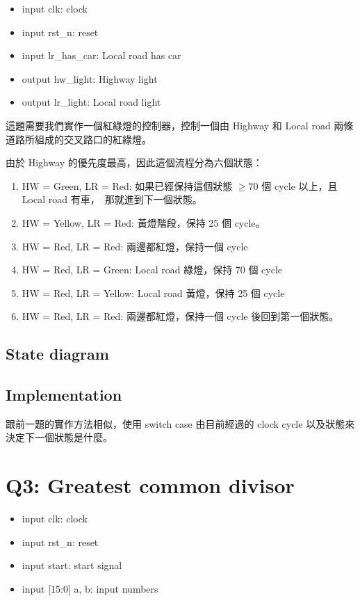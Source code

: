 \documentclass[10.5pt,compsoc,UTF8]{CjC}
\theoremstyle{mystyle}
\begin{document}
\begin{itemize}
  \item input clk: clock
  \item input rst\_n: reset
  \item input lr\_has\_car: Local road has car
  \item output hw\_light: Highway light
  \item output lr\_light: Local road light
\end{itemize}

這題需要我們實作一個紅綠燈的控制器，控制一個由 Highway 和 Local road 兩條道路所組成的交叉路口的紅綠燈。
\par
由於 Highway 的優先度最高，因此這個流程分為六個狀態：
\begin{enumerate}
  \item HW = Green, LR = Red: 如果已經保持這個狀態 $\ge 70$ 個 cycle 以上，且 Local road 有車，\
        那就進到下一個狀態。
  \item HW = Yellow, LR = Red: 黃燈階段，保持 25 個 cycle。
  \item HW = Red, LR = Red: 兩邊都紅燈，保持一個 cycle
  \item HW = Red, LR = Green: Local road 綠燈，保持 70 個 cycle
  \item HW = Red, LR = Yellow: Local road 黃燈，保持 25 個 cycle
  \item HW = Red, LR = Red: 兩邊都紅燈，保持一個 cycle 後回到第一個狀態。
\end{enumerate}

\subsection{State diagram}

\subsection{Implementation}
跟前一題的實作方法相似，使用 switch case 由目前經過的 clock cycle 以及狀態來決定下一個狀態是什麼。


\section{Q3: Greatest common divisor}
\begin{itemize}
  \item input clk: clock
  \item input rst\_n: reset
  \item input start: start signal
  \item input [15:0] a, b: input numbers
\end{itemize}
\end{document}
